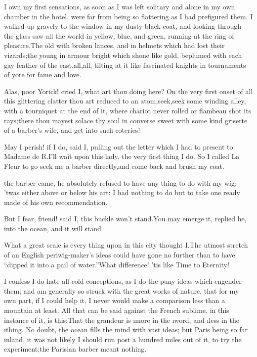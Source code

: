\documentclass[twoside]{article}
\begin{document}
I own my first sensations, as soon as I was left solitary and alone in my
own chamber in the hotel, were far from being so flattering as I had
prefigured them.  I walked up gravely to the window in my dusty black
coat, and looking through the glass saw all the world in yellow, blue,
and green, running at the ring of pleasure.\tsk The old with broken lances,
and in helmets which had lost their vizards;\tsk the young in armour bright
which shone like gold, beplumed with each gay feather of the
east,\tsk all,\tsk all, tilting at it like fascinated knights in tournaments of
yore for fame and love.\tsk 

Alas, poor Yorick! cried I, what art thou doing here?  On the very first
onset of all this glittering clatter thou art reduced to an
atom;\tsk seek,\tsk seek some winding alley, with a tourniquet at the end of it,
where chariot never rolled or flambeau shot its rays;\tsk there thou mayest
solace thy soul in converse sweet with some kind grisette of a barber’s
wife, and get into such coteries!\tsk 

\tsk May I perish! if I do, said I, pulling out the letter which I had to
present to Madame de R\tsk .\tsk I’ll wait upon this lady, the very first thing I
do.  So I called La Fleur to go seek me a barber directly,\tsk and come back
and brush my coat.






 the barber came, he absolutely refused to have any thing to do with
my wig: ’twas either above or below his art: I had nothing to do but to
take one ready made of his own recommendation.

\tsk But I fear, friend! said I, this buckle won’t stand.\tsk You may emerge it,
replied he, into the ocean, and it will stand.\tsk 

What a great scale is every thing upon in this city thought I.\tsk The utmost
stretch of an English periwig-maker’s ideas could have gone no further
than to have “dipped it into a pail of water.”\tsk What difference! ’tis like
Time to Eternity!

I confess I do hate all cold conceptions, as I do the puny ideas which
engender them; and am generally so struck with the great works of nature,
that for my own part, if I could help it, I never would make a comparison
less than a mountain at least.  All that can be said against the French
sublime, in this instance of it, is this:\tsk That the grandeur is \i{more} in
the \i{word}, and \i{less} in the \i{thing}.  No doubt, the ocean fills the
mind with vast ideas; but Paris being so far inland, it was not likely I
should run post a hundred miles out of it, to try the experiment;\tsk the
Parisian barber meant nothing.\tsk 
\end{document}
